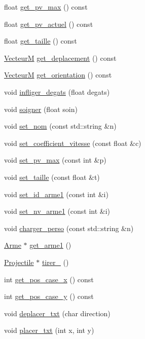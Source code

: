 \begin{DoxyCompactItemize}
\item 
float \hyperlink{classPerso_a5a56b6db9d25cf6c34ebb16d31a0b7a5}{get\+\_\+pv\+\_\+max} () const 
\item 
float \hyperlink{classPerso_aa7ca3080d319f62908c10f777fe93811}{get\+\_\+pv\+\_\+actuel} () const 
\item 
float \hyperlink{classPerso_a37f3623645e49fd9408a350f75eac62f}{get\+\_\+taille} () const 
\item 
\hyperlink{classVecteurM}{VecteurM} \hyperlink{classPerso_a39dfcd62e64dde90953ac3fe3aa7d53d}{get\+\_\+deplacement} () const 
\item 
\hyperlink{classVecteurM}{VecteurM} \hyperlink{classPerso_a7092b7aef8e99d900db50114d55cab2b}{get\+\_\+orientation} () const 
\item 
void \hyperlink{classPerso_aa090d23e55bbbda0cf572d9cbdb294e6}{infliger\+\_\+degats} (float degats)
\item 
void \hyperlink{classPerso_a26cb7f4235726561a55d6feb585cf789}{soigner} (float soin)
\item 
void \hyperlink{classPerso_a072d564a8bca3b10d03acbffc9dacfea}{set\+\_\+nom} (const std\+::string \&n)
\item 
void \hyperlink{classPerso_aa687e5caeb62f90622ad1a09e4e95380}{set\+\_\+coefficient\+\_\+vitesse} (const float \&c)
\item 
void \hyperlink{classPerso_a197f7c4a5ca9677ebc597a56b64d066c}{set\+\_\+pv\+\_\+max} (const int \&p)
\item 
void \hyperlink{classPerso_aba25d0e7ca796d4b5f05b9a4ff34d239}{set\+\_\+taille} (const float \&t)
\item 
void \hyperlink{classPerso_ac6538c0cccd1f7703fabadf491737a41}{set\+\_\+id\+\_\+arme1} (const int \&i)
\item 
void \hyperlink{classPerso_a4f35ce41db777a555946a52609a48ee3}{set\+\_\+nv\+\_\+arme1} (const int \&i)
\item 
void \hyperlink{classPerso_a12d61850ed6d9e1ce8da1b95a976e5cb}{charger\+\_\+perso} (const std\+::string \&n)
\item 
\hyperlink{classArme}{Arme} $\ast$ \hyperlink{classPerso_aa8e41cc8879e7aaccfd2b378a0015ebc}{get\+\_\+arme1} ()
\item 
\hyperlink{classProjectile}{Projectile} $\ast$ \hyperlink{classPerso_a213b97f622aa98972c106d232f6a66b6}{tirer\+\_} ()
\item 
int \hyperlink{classPerso_a4a277ad575018af259025b8008a66c99}{get\+\_\+pos\+\_\+case\+\_\+x} () const 
\item 
int \hyperlink{classPerso_a7ac28cb2b5131123254d8b5a358a84a0}{get\+\_\+pos\+\_\+case\+\_\+y} () const 
\item 
void \hyperlink{classPerso_a7903c80e4915a2f3a45452360b69b798}{deplacer\+\_\+txt} (char direction)
\item 
void \hyperlink{classPerso_a7ba97b055676c800724ba1f1faf4c517}{placer\+\_\+txt} (int x, int y)
\end{DoxyCompactItemize}


